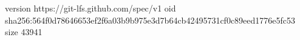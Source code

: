 version https://git-lfs.github.com/spec/v1
oid sha256:564f0d78646653ef2f6a03b9b975e3d7b64cb42495731cf0c89eed1776e5fc53
size 43941
